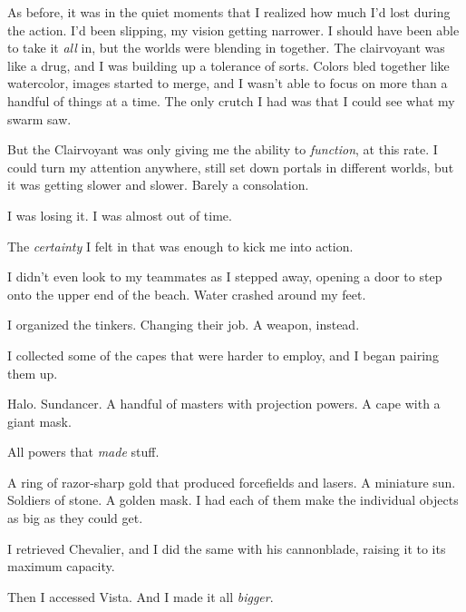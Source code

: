 As before, it was in the quiet moments that I realized how much I'd lost during the action.  I'd been slipping, my vision getting narrower.  I should have been able to take it \emph{all} in, but the worlds were blending in together.  The clairvoyant was like a drug, and I was building up a tolerance of sorts.  Colors bled together like watercolor, images started to merge, and I wasn't able to focus on more than a handful of things at a time.  The only crutch I had was that I could see what my swarm saw.



But the Clairvoyant was only giving me the ability to \emph{function}, at this rate.  I could turn my attention anywhere, still set down portals in different worlds, but it was getting slower and slower.  Barely a consolation.



I was losing it.  I was almost out of time.



The \emph{certainty} I felt in that was enough to kick me into action.



I didn't even look to my teammates as I stepped away, opening a door to step onto the upper end of the beach.  Water crashed around my feet.



I organized the tinkers.  Changing their job.  A weapon, instead.



I collected some of the capes that were harder to employ, and I began pairing them up.



Halo.  Sundancer.  A handful of masters with projection powers.  A cape with a giant mask.



All powers that \emph{made} stuff.



A ring of razor-sharp gold that produced forcefields and lasers.  A miniature sun.  Soldiers of stone.  A golden mask.  I had each of them make the individual objects as big as they could get.



I retrieved Chevalier, and I did the same with his cannonblade, raising it to its maximum capacity.



Then I accessed Vista.  And I made it all \emph{bigger}.



